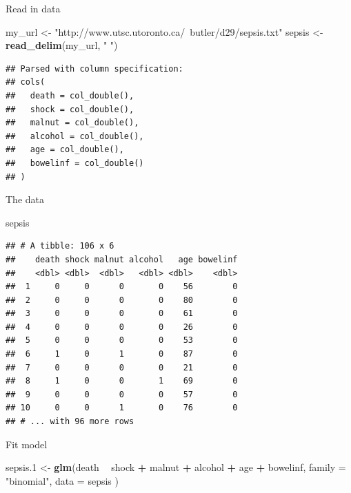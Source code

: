 \documentclass[
  ignorenonframetext,
]{beamer}
\newenvironment{Shaded}{\begin{snugshade}}{\end{snugshade}}
\newcommand{\DataTypeTok}[1]{\textcolor[rgb]{0.13,0.29,0.53}{#1}}
\newcommand{\FloatTok}[1]{\textcolor[rgb]{0.00,0.00,0.81}{#1}}
\newcommand{\KeywordTok}[1]{\textcolor[rgb]{0.13,0.29,0.53}{\textbf{#1}}}
\newcommand{\NormalTok}[1]{#1}
\newcommand{\OperatorTok}[1]{\textcolor[rgb]{0.81,0.36,0.00}{\textbf{#1}}}
\newcommand{\StringTok}[1]{\textcolor[rgb]{0.31,0.60,0.02}{#1}}
\begin{document}
\begin{frame}[fragile]{Read in data}
\protect\hypertarget{read-in-data}{}

\begin{Shaded}
\begin{Highlighting}[]
\NormalTok{my_url <-}\StringTok{ }
\StringTok{  "http://www.utsc.utoronto.ca/~butler/d29/sepsis.txt"}
\NormalTok{sepsis <-}\StringTok{ }\KeywordTok{read_delim}\NormalTok{(my_url, }\StringTok{" "}\NormalTok{)}
\end{Highlighting}
\end{Shaded}

\begin{verbatim}
## Parsed with column specification:
## cols(
##   death = col_double(),
##   shock = col_double(),
##   malnut = col_double(),
##   alcohol = col_double(),
##   age = col_double(),
##   bowelinf = col_double()
## )
\end{verbatim}

\end{frame}

\begin{frame}[fragile]{The data}
\protect\hypertarget{the-data-2}{}

\begin{Shaded}
\begin{Highlighting}[]
\NormalTok{sepsis}
\end{Highlighting}
\end{Shaded}

\begin{verbatim}
## # A tibble: 106 x 6
##    death shock malnut alcohol   age bowelinf
##    <dbl> <dbl>  <dbl>   <dbl> <dbl>    <dbl>
##  1     0     0      0       0    56        0
##  2     0     0      0       0    80        0
##  3     0     0      0       0    61        0
##  4     0     0      0       0    26        0
##  5     0     0      0       0    53        0
##  6     1     0      1       0    87        0
##  7     0     0      0       0    21        0
##  8     1     0      0       1    69        0
##  9     0     0      0       0    57        0
## 10     0     0      1       0    76        0
## # ... with 96 more rows
\end{verbatim}

\end{frame}

\begin{frame}[fragile]{Fit model}
\protect\hypertarget{fit-model}{}

\begin{Shaded}
\begin{Highlighting}[]
\NormalTok{sepsis}\FloatTok{.1}\NormalTok{ <-}\StringTok{ }\KeywordTok{glm}\NormalTok{(death }\OperatorTok{~}\StringTok{ }\NormalTok{shock }\OperatorTok{+}\StringTok{ }\NormalTok{malnut }\OperatorTok{+}\StringTok{ }\NormalTok{alcohol }\OperatorTok{+}\StringTok{ }\NormalTok{age }\OperatorTok{+}
\StringTok{  }\NormalTok{bowelinf,}
\DataTypeTok{family =} \StringTok{"binomial"}\NormalTok{,}
\DataTypeTok{data =}\NormalTok{ sepsis}
\NormalTok{)}
\end{Highlighting}
\end{Shaded}

\end{frame}
\end{document}
